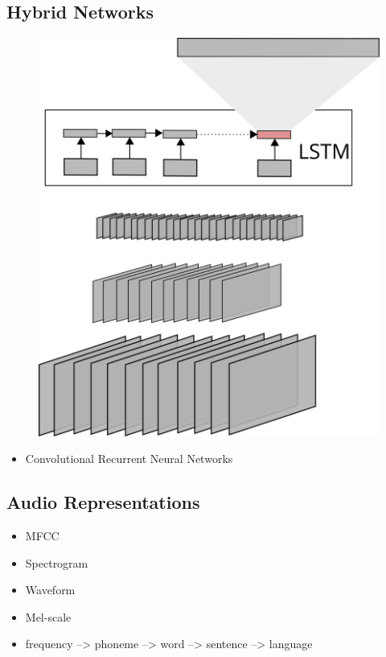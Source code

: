 \subsection{Hybrid Networks}
\label{sec:hybrid_networks}

	\begin{figure}[]
  		\centering
    	\includegraphics[width=\textwidth, keepaspectratio]{img/crnn.png}
    	\caption{}
    	\label{fig:crnn}
	\end{figure}

    \begin{itemize}
        \item Convolutional Recurrent Neural Networks
    \end{itemize}

\subsection{Audio Representations}
\label{sec:audio_representations}
    \begin{itemize}
        \item MFCC
        \item Spectrogram
        \item Waveform
        \item Mel-scale
        \item frequency --> phoneme --> word --> sentence --> language
    \end{itemize}